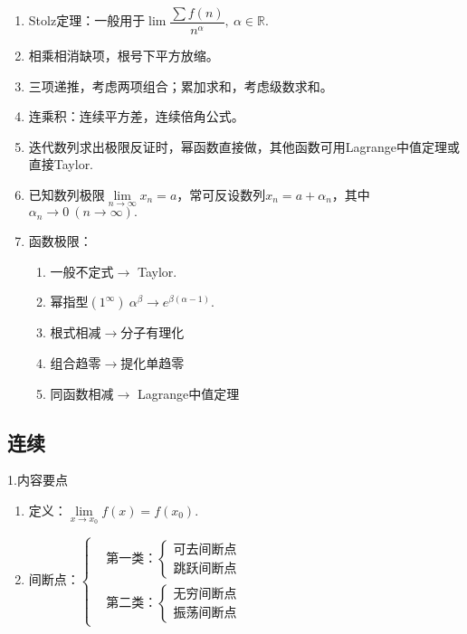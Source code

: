\documentclass[UTF8]{ctexart}
\newcommand\no{\noindent}
\newcommand\dis{\displaystyle}
\newcommand\limit{\dis\lim\limits}
\newcommand\limn{\dis\lim\limits_{n\to\infty}}
\begin{document}
\begin{spacing}{2}
\begin{enumerate}[itemindent=1.4em, label=(\arabic*)]
\item Stolz定理：一般用于$\lim\dfrac{\sum f(n)}{n^\alpha},\ \alpha\in\mathbb{R}$.

\item 相乘相消缺项，根号下平方放缩。

\item 三项递推，考虑两项组合；累加求和，考虑级数求和。

\item 连乘积：连续平方差，连续倍角公式。

\item 迭代数列求出极限反证时，幂函数直接做，其他函数可用Lagrange中值定理或直接Taylor.

\item 已知数列极限$\limn x_n=a$，常可反设数列$x_n=a+\alpha_n$，其中$\alpha_n\to0\ (n\to\infty).$

\item 函数极限：

\begin{enumerate}[itemindent=1.4em, label=(\alph*)]

\item 一般不定式$\longrightarrow$ Taylor.

\item 幂指型$(1^\infty)\ \alpha^\beta\longrightarrow e^{\beta(\alpha-1)}.$

\item 根式相减$\longrightarrow$分子有理化

\item 组合趋零$\longrightarrow$提化单趋零

\item 同函数相减$\longrightarrow$ Lagrange中值定理

\end{enumerate}

\end{enumerate}

\subsection{连续}

\no1.内容要点

\begin{enumerate}[itemindent=1.4em, label=(\arabic*)]

\item 定义：$\limit_{x\to x_0}f(x)=f(x_0).$

\item $\text{间断点：}\left\{
\begin{aligned}
&\text{第一类：} \left\{ \begin{aligned} \text{可去间断点}\\
\text{跳跃间断点}
\end{aligned}
\right. \\
&\text{第二类：}			%
\left\{ \begin{aligned} \text{无穷间断点}\\
\text{振荡间断点}
\end{aligned}
\right. 
\end{aligned}
\right.$


\end{enumerate}
\end{spacing}
\end{document}
